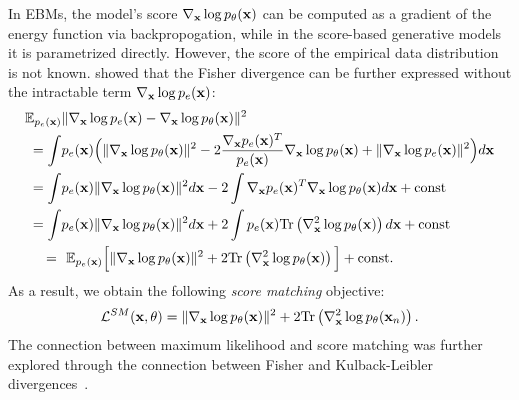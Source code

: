 In EBMs, the model's score $\nabla_{{\mathbf{x}}}\log p_{\theta}({\mathbf{x}})$ can be computed as a gradient of the energy function via backpropogation, while in the score-based generative models it is parametrized directly. However, the score of the empirical data distribution is not known. 
\citet{hyvarinen2005estimation} showed that the Fisher divergence can be further expressed without the intractable term  $\nabla_{{\mathbf{x}}} \log p_{e}({\mathbf{x}})$: 
\begin{align}
\E_{p_{e}(\rvx)}&\|\nabla_{\rvx} \log p_{e}(\rvx) - \nabla_{\rvx}\log p_{\theta}(\rvx)\|^2 \notag \\
 = \int& p_e(\rvx) \Big(\|\nabla_{\rvx}\log p_{\theta}(\rvx)\|^2 - 2 \frac{\nabla_{\rvx}p_{e}(\rvx)^T}{p_{e}(\rvx)} \nabla_{\rvx}\log p_{\theta}(\rvx)  + \|\nabla_{\rvx} \log p_{e}(\rvx)\|^2 \Big)d\rvx \notag \\
= \int& p_e(\rvx) \|\nabla_{\rvx}\log p_{\theta}(\rvx)\|^2d\rvx 
    - 2 \int \nabla_{\rvx}p_{e}(\rvx)^T \nabla_{\rvx}\log p_{\theta}(\rvx)d\rvx  + \text{const}  \label{eq:sm_2}\\
= \int & p_e(\rvx) \|\nabla_{\rvx}\log p_{\theta}(\rvx)\|^2d\rvx 
    + 2 \int p_{e}(\rvx) \text{Tr}\left(\nabla^2_{\rvx}\log p_{\theta}(\rvx)\right)d\rvx  + \text{const} \label{eq:sm_3} \\
= \,\,&\,\,\E_{p_e(\rvx)} \Big[ \|\nabla_{\rvx}\log p_{\theta}(\rvx)\|^2 
    + 2 \text{Tr}\left(\nabla^2_{\rvx}\log p_{\theta}(\rvx)\right)\Big]  + \text{const}. \label{eq:sm_4}     
\end{align}
As a result, we obtain the following \textit{score matching} objective:
\begin{equation}\label{eq:score_matching}
\begin{aligned}
\mathcal{L}^{SM}(\rvx, \theta)   =  \|\nabla_{\rvx}\log p_{\theta}(\rvx)\|^2 + 2\text{Tr}\left(\nabla^2_{\rvx}\log p_{\theta}(\rvx_n)\right).
\end{aligned}
\end{equation}
The connection between maximum likelihood and score matching was further explored through the connection between Fisher and Kulback-Leibler divergences~\cite{lyu2009interpretation}.

